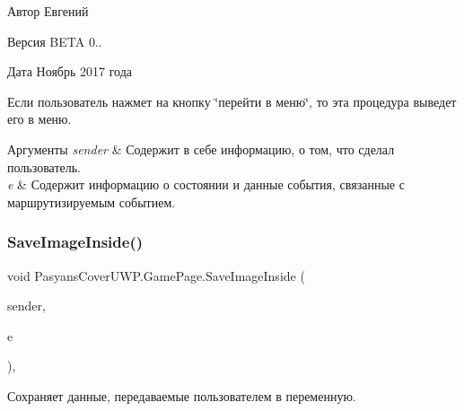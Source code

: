 \begin{DoxyAuthor}{Автор}
Евгений 
\end{DoxyAuthor}
\begin{DoxyVersion}{Версия}
B\+E\+TA 0.. 
\end{DoxyVersion}
\begin{DoxyDate}{Дата}
Ноябрь 2017 года
\end{DoxyDate}
Если пользователь нажмет на кнопку \char`\"{}перейти в меню\char`\"{}, то эта процедура выведет его в меню. 
\begin{DoxyParams}{Аргументы}
{\em sender} & Содержит в себе информацию, о том, что сделал пользователь. \\
\hline
{\em e} & Содержит информацию о состоянии и данные события, связанные с маршрутизируемым событием. \\
\hline
\end{DoxyParams}
\mbox{\label{class_pasyans_cover_u_w_p_1_1_game_page_a4d7e48fd54d238c77192dc04fb3f64a4}} 
\subsubsection{\texorpdfstring{Save\+Image\+Inside()}{SaveImageInside()}}
{\footnotesize\ttfamily void Pasyans\+Cover\+U\+W\+P.\+Game\+Page.\+Save\+Image\+Inside (\begin{DoxyParamCaption}\item[{object}]{sender,  }\item[{Routed\+Event\+Args}]{e }\end{DoxyParamCaption})\hspace{0.3cm}{\ttfamily [inline]}, {\ttfamily [private]}}



Сохраняет данные, передаваемые пользователем в переменную. 

